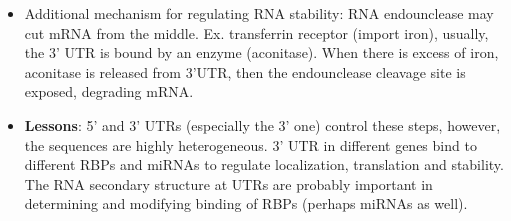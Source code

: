 \documentclass{report}
\begin{document}
\begin{itemize}
	\item Additional mechanism for regulating RNA stability: RNA endounclease may cut mRNA from the middle. Ex. transferrin receptor (import iron), usually, the 3' UTR is bound by an enzyme (aconitase). When there is excess of iron, aconitase is released from 3'UTR, then the endounclease cleavage site is exposed, degrading mRNA. 
	
	\item \textbf{Lessons}: 5' and 3' UTRs (especially the 3' one) control these steps, however, the sequences are highly heterogeneous. 3' UTR in different genes bind to different RBPs and miRNAs to regulate localization, translation and stability. The RNA secondary structure at UTRs are probably important in determining and modifying binding of RBPs (perhaps miRNAs as well). 
\end{itemize}
\end{document}

